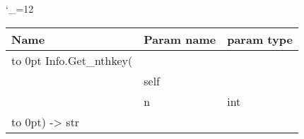 \begingroup \catcode`\_=12 \tt
\begin{tabular}{lll}
\toprule
\textrm{Name}&\textrm{Param name}&\textrm{param type}\\
\midrule
\hbox to 0pt {Info.Get_nthkey(\hss}\\
& self\\
& n & int\\
\hbox to 0pt{) -> str\hss}\\
\bottomrule
\end{tabular}
\endgroup
